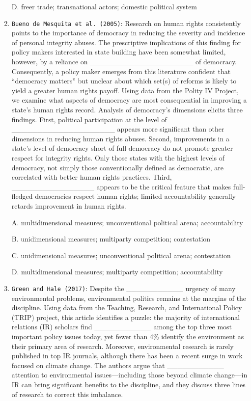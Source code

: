 \documentclass[
]{book}
\begin{document}
\begin{enumerate}
  D. freer trade; transnational actors; domestic political system
\item
  \texttt{Bueno\ de\ Mesquita\ et\ al.\ (2005)}: Research on human rights consistently points to the importance of democracy in reducing the severity and incidence of personal integrity abuses. The prescriptive implications of this finding for policy makers interested in state building have been somewhat limited, however, by a reliance on \_\_\_\_\_\_\_\_\_\_\_\_\_\_\_\_\_\_\_\_ of democracy. Consequently, a policy maker emerges from this literature confident that ``democracy matters'' but unclear about which set(s) of reforms is likely to yield a greater human rights payoff. Using data from the Polity IV Project, we examine what aspects of democracy are most consequential in improving a state's human rights record. Analysis of democracy's dimensions elicits three findings. First, political participation at the level of \_\_\_\_\_\_\_\_\_\_\_\_\_\_\_\_\_\_\_\_ appears more significant than other dimensions in reducing human rights abuses. Second, improvements in a state's level of democracy short of full democracy do not promote greater respect for integrity rights. Only those states with the highest levels of democracy, not simply those conventionally defined as democratic, are correlated with better human rights practices. Third, \_\_\_\_\_\_\_\_\_\_\_\_\_\_\_\_ appears to be the critical feature that makes full-fledged democracies respect human rights; limited accountability generally retards improvement in human rights.

  A. multidimensional measures; unconventional political arena; accountability

  B. unidimensional measures; multiparty competition; contestation

  C. unidimensional measures; unconventional political arena; contestation

  D. multidimensional measures; multiparty competition; accountability
\item
  \texttt{Green\ and\ Hale\ (2017)}: Despite the \_\_\_\_\_\_\_\_\_\_\_ urgency of many environmental problems, environmental politics remains at the margins of the discipline. Using data from the Teaching, Research, and International Policy (TRIP) project, this article identifies a puzzle: the majority of international relations (IR) scholars find \_\_\_\_\_\_\_\_\_\_\_ among the top three most important policy issues today, yet fewer than 4\% identify the environment as their primary area of research. Moreover, environmental research is rarely published in top IR journals, although there has been a recent surge in work focused on climate change. The authors argue that \_\_\_\_\_\_\_\_\_\_\_ attention to environmental issues---including those beyond climate change---in IR can bring significant benefits to the discipline, and they discuss three lines of research to correct this imbalance.


\end{enumerate}
\end{document}
